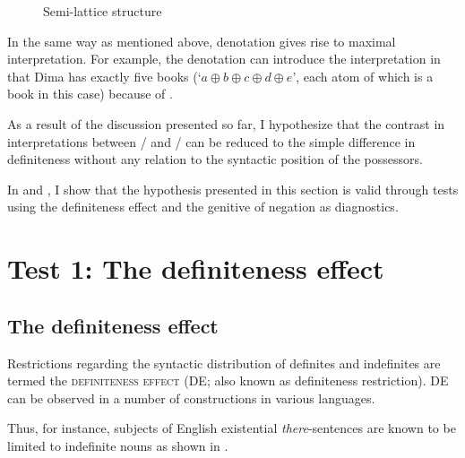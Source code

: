 \documentclass[output=paper]{langscibook}
\begin{document}
\begin{figure}[h]
\caption{Semi-lattice structure}\label{SLS}
\end{figure}

In the same way as mentioned above, denotation  gives rise to maximal interpretation. For example, the denotation can introduce the interpretation in  that Dima has exactly five books (`$a\oplus b\oplus c\oplus d\oplus e$', each atom of which is a book in this case) because of .

As a result of the discussion presented so far, I hypothesize that the contrast in interpretations between / and / can be reduced to the simple difference in definiteness without any relation to the syntactic position of the possessors.

In  and , I show that the hypothesis presented in this section is valid through tests using the definiteness effect and the genitive of negation as diagnostics.

\section{Test 1: The definiteness effect}\label{secDE}
\subsection{The definiteness effect}

Restrictions regarding the syntactic distribution of definites and indefinites are termed the \textsc{definiteness effect} (DE; also known as definiteness restriction). DE can be observed in a number of constructions in various languages.

Thus, for instance, subjects of English existential \textit{there}-sentences are known to be limited to indefinite nouns as shown in .

\ea \label{en}
\z\z
\end{document}
